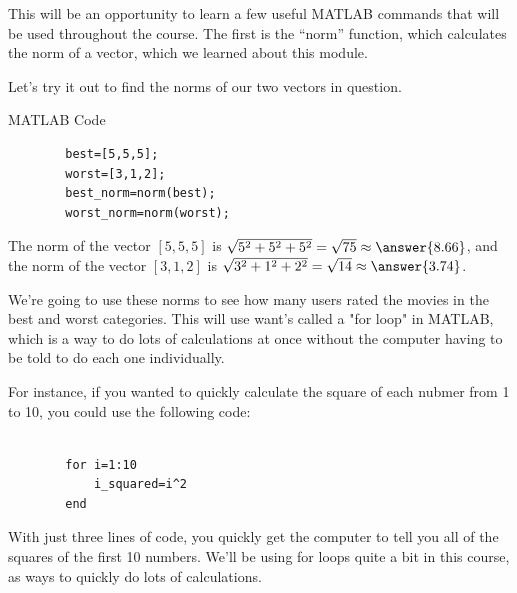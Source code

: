 \documentclass{ximera}
\begin{document}
  This will be an opportunity to learn a few useful MATLAB commands that will be used throughout the course. The first is the ``norm'' function, which calculates the norm of a vector, which we learned about this module.

  Let's try it out to find the norms of our two vectors in question. 

  \begin{hint}{MATLAB Code}
    \begin{verbatim}
        best=[5,5,5];
        worst=[3,1,2];
        best_norm=norm(best);
        worst_norm=norm(worst);
    \end{verbatim}
  \end{hint}

  \begin{example}

    The norm of the vector $[5,5,5]$ is $\sqrt{5^2+5^2+5^2}=\sqrt{75}\approx \answer{8.66}$, and the norm of the vector $[3,1,2]$ is $\sqrt{3^2+1^2+2^2}=\sqrt{14}\approx \answer{3.74}$.

  \end{example}

  We're going to use these norms to see how many users rated the movies in the best and worst categories. This will use want's called a "for loop" in MATLAB, which is a way to do lots of calculations at once without the computer having to be told to do each one individually.

  \begin{example}
  
  For instance, if you wanted to quickly calculate the square of each nubmer from 1 to 10, you could use the following code:
  \begin{verbatim}

        for i=1:10
            i_squared=i^2
        end

  \end{verbatim}

    With just three lines of code, you quickly get the computer to tell you all of the squares of the first 10 numbers. We'll be using for loops quite a bit in this course, as ways to quickly do lots of calculations. 

  \end{example}
\end{document}
